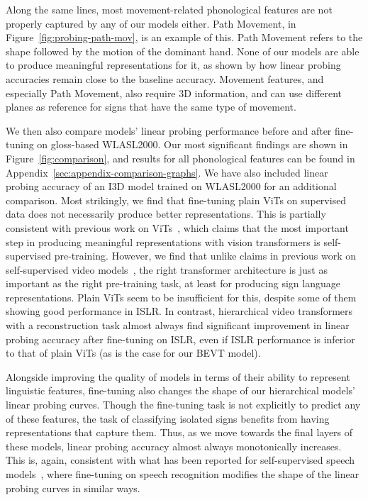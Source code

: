 Along the same lines, most movement-related phonological features are not properly captured by any of our models either. Path Movement, in Figure~\ref{fig:probing-path-mov}, is an example of this. Path Movement refers to the shape followed by the motion of the dominant hand. None of our models are able to produce meaningful representations for it, as shown by how linear probing accuracies remain close to the baseline accuracy. Movement features, and especially Path Movement, also require 3D information, and can use different planes as reference for signs that have the same type of movement.

We then also compare models' linear probing performance before and after fine-tuning on gloss-based WLASL2000. Our most significant findings are shown in Figure~\ref{fig:comparison}, and results for all phonological features can be found in Appendix~\ref{sec:appendix-comparison-graphs}. We have also included linear probing accuracy of an I3D model trained on WLASL2000 for an additional comparison. Most strikingly, we find that fine-tuning plain ViTs on supervised data does not necessarily produce better representations. This is partially consistent with previous work on ViTs~\cite{caron2021emerging}, which claims that the most important step in producing meaningful representations with vision transformers is self-supervised pre-training. However, we find that unlike claims in previous work on self-supervised video models~\cite{Tong2022VideoMAE}, the right transformer architecture is just as important as the right pre-training task, at least for producing sign language representations. Plain ViTs seem to be insufficient for this, despite some of them showing good performance in ISLR. In contrast, hierarchical video transformers with a reconstruction task almost always find significant improvement in linear probing accuracy after fine-tuning on ISLR, even if ISLR performance is inferior to that of plain ViTs (as is the case for our BEVT model).

Alongside improving the quality of models in terms of their ability to represent linguistic features, fine-tuning also changes the shape of our hierarchical models' linear probing curves. Though the fine-tuning task is not explicitly to predict any of these features, the task of classifying isolated signs benefits from having representations that capture them. Thus, as we move towards the final layers of these models, linear probing accuracy almost always monotonically increases. This is, again, consistent with what has been reported for self-supervised speech models~\cite{pasad2021layer}, where fine-tuning on speech recognition modifies the shape of the linear probing curves in similar ways.

